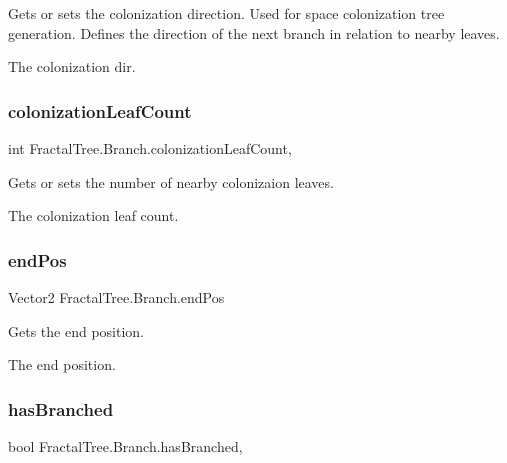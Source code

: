 Gets or sets the colonization direction. Used for space colonization tree generation. Defines the direction of the next branch in relation to nearby leaves. 

The colonization dir.\mbox{\label{interface_fractal_tree_1_1_branch_a218b95e107b90de1f7e0587a95c53afc}} 
\subsubsection{\texorpdfstring{colonization\+Leaf\+Count}{colonizationLeafCount}}
{\footnotesize\ttfamily int Fractal\+Tree.\+Branch.\+colonization\+Leaf\+Count\hspace{0.3cm}{\ttfamily [get]}, {\ttfamily [set]}}



Gets or sets the number of nearby colonizaion leaves. 

The colonization leaf count.\mbox{\label{interface_fractal_tree_1_1_branch_a5fb0f25128777e86c137a98958f3072b}} 
\subsubsection{\texorpdfstring{end\+Pos}{endPos}}
{\footnotesize\ttfamily Vector2 Fractal\+Tree.\+Branch.\+end\+Pos\hspace{0.3cm}{\ttfamily [get]}}



Gets the end position. 

The end position.\mbox{\label{interface_fractal_tree_1_1_branch_a91cf75bd1bfc1d180be42ee4b461f3e8}} 
\subsubsection{\texorpdfstring{has\+Branched}{hasBranched}}
{\footnotesize\ttfamily bool Fractal\+Tree.\+Branch.\+has\+Branched\hspace{0.3cm}{\ttfamily [get]}, {\ttfamily [set]}}



